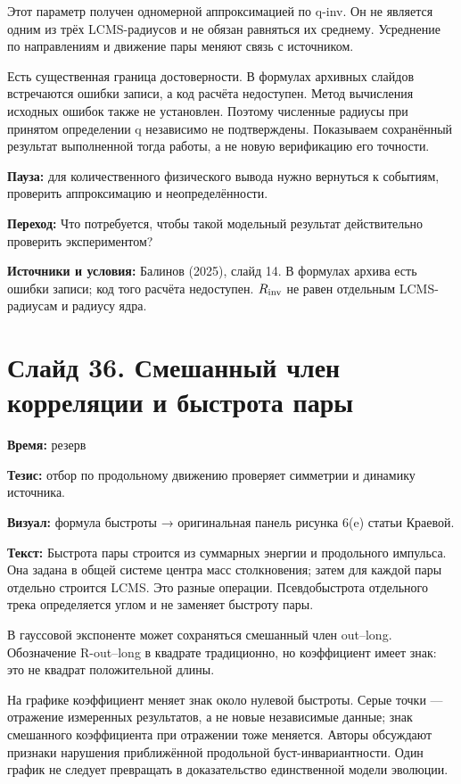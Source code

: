 \documentclass[11pt,a4paper]{article}
\begin{document}
Этот параметр получен одномерной аппроксимацией по q-inv. Он не является одним из трёх LCMS-радиусов и не обязан равняться их среднему. Усреднение по направлениям и движение пары меняют связь с источником.

Есть существенная граница достоверности. В формулах архивных слайдов встречаются ошибки записи, а код расчёта недоступен. Метод вычисления исходных ошибок также не установлен. Поэтому численные радиусы при принятом определении q независимо не подтверждены. Показываем сохранённый результат выполненной тогда работы, а не новую верификацию его точности.

\textbf{Пауза:} для количественного физического вывода нужно вернуться к событиям, проверить аппроксимацию и неопределённости.

\textbf{Переход:} Что потребуется, чтобы такой модельный результат действительно проверить экспериментом?

\textbf{Источники и условия:} Балинов (2025), слайд 14. В формулах архива есть ошибки записи; код того расчёта недоступен. \(R_{\rm inv}\) не равен отдельным LCMS-радиусам и радиусу ядра.

\clearpage
\section*{Слайд 36. Смешанный член корреляции и быстрота пары}
\textbf{Время:} резерв

\textbf{Тезис:} отбор по продольному движению проверяет симметрии и динамику источника.

\textbf{Визуал:} формула быстроты → оригинальная панель рисунка 6(e) статьи Краевой.

\textbf{Текст:} Быстрота пары строится из суммарных энергии и продольного импульса. Она задана в общей системе центра масс столкновения; затем для каждой пары отдельно строится LCMS. Это разные операции. Псевдобыстрота отдельного трека определяется углом и не заменяет быстроту пары.

В гауссовой экспоненте может сохраняться смешанный член out–long. Обозначение R-out–long в квадрате традиционно, но коэффициент имеет знак: это не квадрат положительной длины.

На графике коэффициент меняет знак около нулевой быстроты. Серые точки — отражение измеренных результатов, а не новые независимые данные; знак смешанного коэффициента при отражении тоже меняется. Авторы обсуждают признаки нарушения приближённой продольной буст-инвариантности. Один график не следует превращать в доказательство единственной модели эволюции.
\end{document}
